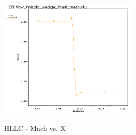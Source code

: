 \begin{figure}[H]
\centering
\includegraphics[width=0.6\textwidth]{text/Mach_Per_Shock_Inviscid_Wedge.png}\\
\caption[HLLC - Mach vs. X]{HLLC - Mach vs. X}
\label{fig: Mach vs. X}
\end{figure}

